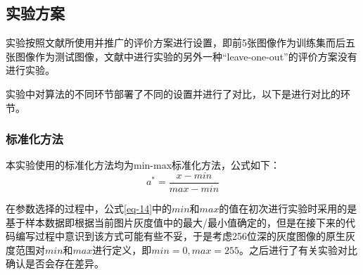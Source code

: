 \documentclass[UTF8]{ctexart}
\begin{document}
\subsection{实验方案}
实验按照文献\cite{1261097}所使用并推广的评价方案进行设置，即前5张图像作为训练集而后五张图像作为测试图像，文献\cite{4359331}中进行实验的另外一种“leave-one-out”的评价方案没有进行实验。\par
实验中对算法的不同环节部署了不同的设置并进行了对比，以下是进行对比的环节。
\subsubsection{标准化方法}
本实验使用的标准化方法均为min-max标准化方法，公式如下：
\begin{equation}\label{eq-14}
    a^*=\frac{x-min}{max-min}
\end{equation}
\par
在参数选择的过程中，公式\eqref{eq-14}中的\(min\)和\(max\)的值在初次进行实验时采用的是基于样本数据即根据当前图片灰度值中的最大/最小值确定的，但是在接下来的代码编写过程中意识到该方式可能有些不妥，于是考虑256位深的灰度图像的原生灰度范围对\(min\)和\(max\)进行定义，即\(min=0,max=255\)。之后进行了有关实验对比确认是否会存在差异。
\end{document}
